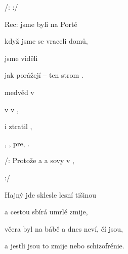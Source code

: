 

/:     :/

Rec:     jsme byli  na Portě  

 když jsme se vraceli  domů, 

 jsme viděli 

jak porážejí  --  ten strom .    

\zs
{} medvěd  v  

 v  v  ,

  i  ztratil ,

, , pre, .
\ks

\zr
/: Protože  a  a  sovy v  ,   

        :/
\kr

\zs
Hajný jde sklesle lesní tišinou

a cestou sbírá umrlé zmije,

včera byl na bábě a dnes neví, čí jsou,

a jestli jsou to zmije nebo schizofrénie.
\ks

\zr  \kr

\kp






















